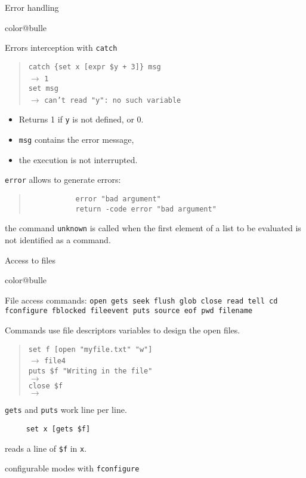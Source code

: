\documentclass[a4paper,landscape,smooth]{show}
\newcommand{\tclex}[2]{\texttt{#1}\\$\rightarrow$ \texttt{#2}}
\begin{document}
\begin{tslide}{Error handling}
   \vfill
   \begin{bitemize}{color@bulle}
      \item Errors interception with \texttt{catch}
      \begin{quote}
	 \tclex{catch \{set x [expr \$y + 3]\} msg}{1}\\
	 \tclex{set msg}{can't read "y": no such variable}
      \end{quote}
      \begin{itemize}
	 \item Returns 1 if \texttt{y} is not defined, or 0.
	 \item  \texttt{msg} contains the error message,
	 \item the execution is not interrupted.
      \end{itemize}

      \item \texttt{error} allows to generate errors:
	 \begin{quote}
	    \begin{verbatim}
	       error "bad argument"
	       return -code error "bad argument"
	    \end{verbatim}
	 \end{quote}
      \item the command \texttt{unknown} is called when the first
         element of a list to be evaluated is not identified as a
         command. 
   \end{bitemize}
   \vfill
\end{tslide}


\begin{tslide}{Access to files}
   \vfill
   \begin{bitemize}{color@bulle}
      \item File access commands: \texttt{open gets seek flush
	 glob close read tell cd fconfigure fblocked fileevent puts
	 source eof pwd filename}
      \item Commands use file descriptors variables to design the open files.
     \begin{quote}
	 \tclex{set f [open "myfile.txt" "w"]}{file4}\\
	 \tclex{puts \$f "Writing in the file"}{}\\
	 \tclex{close \$f}{}
      \end{quote}

      \item \texttt{gets} and \texttt{puts} work line per line. 
      \begin{verbatim}
	 set x [gets $f]
      \end{verbatim} %
      reads a line of \texttt{\$f} in \texttt{x}. 

      \item configurable modes with \texttt{fconfigure}
   \end{bitemize}
   \vfill
\end{tslide}
\end{document}

